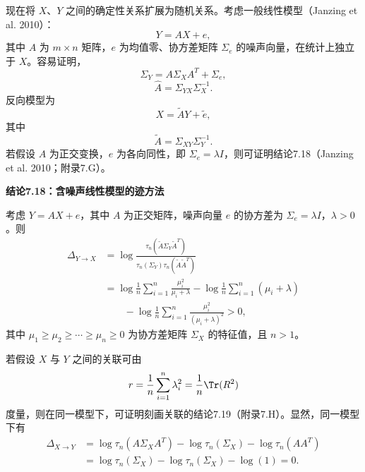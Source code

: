 现在将 $X$、$Y$ 之间的确定性关系扩展为随机关系。考虑一般线性模型（Janzing et al. 2010）：
\begin{equation}
Y=AX+e,
\tag{7.124}
\end{equation}
其中 $A$ 为 $m\times n$ 矩阵，$e$ 为均值零、协方差矩阵 $\Sigma_e$ 的噪声向量，在统计上独立于 $X$。容易证明，
\begin{equation}
\Sigma_Y=A\Sigma_XA^T+\Sigma_e,
\tag{7.125}
\end{equation}
\begin{equation}
\widehat A=\Sigma_{YX}\Sigma_X^{-1}.
\tag{7.126}
\end{equation}
反向模型为
\begin{equation}
X=\widetilde AY+\widetilde e,
\tag{7.127}
\end{equation}
其中
\begin{equation}
\widetilde A=\Sigma_{XY}\Sigma_Y^{-1}.
\tag{7.128}
\end{equation}
若假设 $A$ 为正交变换，$e$ 为各向同性，即 $\Sigma_e=\lambda I$，则可证明结论7.18（Janzing et al. 2010；附录7.G）。

\par\medskip{}\noindent\textbf{结论7.18：含噪声线性模型的迹方法}\par
考虑 $Y=AX+e$，其中 $A$ 为正交矩阵，噪声向量 $e$ 的协方差为 $\Sigma_e=\lambda I$，$\lambda>0$。则
\begin{equation}
\begin{aligned}
\Delta_{Y\to X}
&=\log\frac{\tau_n(\widetilde A\Sigma_Y\widetilde A^T)}
{\tau_n(\Sigma_Y)\tau_n(\widetilde A\widetilde A^T)}\\
&=\log\frac1n\sum_{i=1}^n\frac{\mu_i^2}{\mu_i+\lambda}
-\log\frac1n\sum_{i=1}^n(\mu_i+\lambda)\\
&\hspace{2em}-\log\frac1n\sum_{i=1}^n\frac{\mu_i^2}{(\mu_i+\lambda)^2}>0,
\end{aligned}
\tag{7.129}
\end{equation}
其中 $\mu_1\ge\mu_2\ge\cdots\ge\mu_n\ge0$ 为协方差矩阵 $\Sigma_X$ 的特征值，且 $n>1$。

若假设 $X$ 与 $Y$ 之间的关联可由
\[
r=\frac1n\sum_{i=1}^n\lambda_i^2=\frac1n\Tr(R^2)
\]
度量，则在同一模型下，可证明刻画关联的结论7.19（附录7.H）。显然，同一模型下有
\[
\begin{aligned}
\Delta_{X\to Y}&=\log\tau_n(A\Sigma_XA^T)-\log\tau_n(\Sigma_X)-\log\tau_n(AA^T)\\
&=\log\tau_n(\Sigma_X)-\log\tau_n(\Sigma_X)-\log(1)=0.
\end{aligned}
\]

